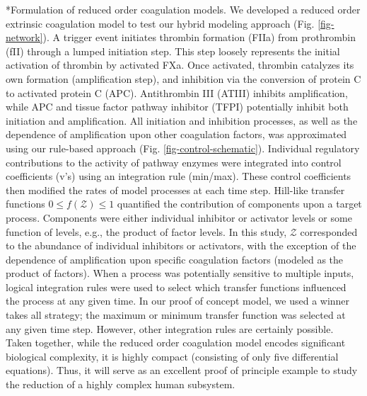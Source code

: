 \documentclass[12pt]{article}
\makeatletter
\renewcommand\subsection{\@startsection
	{subsection}{2}{0mm}
	{-0.05in}
	{-0.5\baselineskip}
	{\normalfont\normalsize\bfseries}}
\makeatother
\begin{document}

\subsection*{Formulation of reduced order coagulation models.}
We developed a reduced order extrinsic coagulation model to test our hybrid modeling approach (Fig. \ref{fig-network}).
A trigger event initiates thrombin formation (FIIa) from prothrombin (fII) through a lumped initiation step.
This step loosely represents the initial activation of thrombin by activated FXa.
Once activated, thrombin catalyzes its own formation (amplification step), and inhibition via the conversion of protein C to activated protein C (APC).
Antithrombin III (ATIII) inhibits amplification, while APC and tissue factor pathway inhibitor (TFPI) potentially inhibit both initiation and amplification. 
All initiation and inhibition processes, as well as the dependence of amplification upon other coagulation factors, was approximated using our rule-based approach (Fig. \ref{fig-control-schematic}). 
Individual regulatory contributions to the activity of pathway enzymes were integrated into control coefficients (v's) using an integration rule (min/max).  
These control coefficients then modified the rates of model processes at each time step.
Hill-like transfer functions $0 \leq f\left(\mathcal{Z}\right) \leq 1$ quantified the contribution of components upon a target process. 
Components were either individual inhibitor or activator levels or some function of levels, e.g., the product of factor levels. 
In this study, $\mathcal{Z}$ corresponded to the abundance of individual inhibitors or activators, 
with the exception of the dependence of amplification upon specific coagulation factors (modeled as the product of factors). 
When a process was potentially sensitive to multiple inputs, logical integration rules were used to select which transfer functions influenced the process at any given time. 
In our proof of concept model, we used a winner takes all strategy; the maximum or minimum transfer function was selected at any given time step. 
However, other integration rules are certainly possible. 
Taken together, while the reduced order coagulation model encodes significant biological complexity, it is highly compact (consisting of only five differential equations). 
Thus, it will serve as an excellent proof of principle example to study the reduction of a highly complex human subsystem.  
\end{document}
